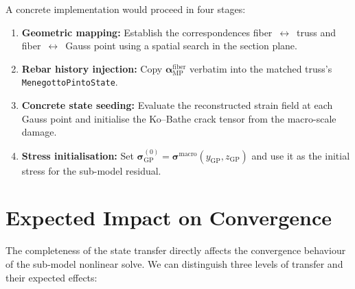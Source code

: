 A concrete implementation would proceed in four stages:

\begin{enumerate}
  \item \textbf{Geometric mapping:}  Establish the correspondences
    fiber~$\leftrightarrow$~truss and fiber~$\leftrightarrow$~Gauss
    point using a spatial search in the section plane.
  \item \textbf{Rebar history injection:}  Copy
    $\boldsymbol{\alpha}_{\text{MP}}^{\text{fiber}}$ verbatim into the
    matched truss's \texttt{MenegottoPintoState}.
  \item \textbf{Concrete state seeding:}  Evaluate the reconstructed
    strain field at each Gauss point and initialise the Ko--Bathe
    crack tensor from the macro-scale damage.
  \item \textbf{Stress initialisation:}  Set
    $\boldsymbol{\sigma}^{(0)}_{\text{GP}}
      = \boldsymbol{\sigma}^{\text{macro}}(y_{\text{GP}}, z_{\text{GP}})$
    and use it as the initial stress for the sub-model residual.
\end{enumerate}


\section{Expected Impact on Convergence}
\label{sec:convergence-impact}

The completeness of the state transfer directly affects the convergence
behaviour of the sub-model nonlinear solve.  We can distinguish three
levels of transfer and their expected effects:

